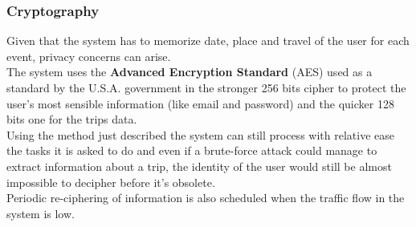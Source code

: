\subsubsection{Cryptography}
Given that the system has to memorize date, place and travel of the user for each event, privacy concerns can arise.\\
The system uses the \textbf{Advanced Encryption Standard} (AES) used as a standard by the U.S.A. government in the stronger 256 bits cipher to protect the user's most sensible information (like email and password) and the quicker 128 bits one for the trips data.\\
Using the method just described the system can still process with relative ease the tasks it is asked to do and even if a brute-force attack could manage to extract information about a trip, the identity of the user would still be almost impossible to decipher before it's obsolete.\\
Periodic re-ciphering of information is also scheduled when the traffic flow in the system is low.















